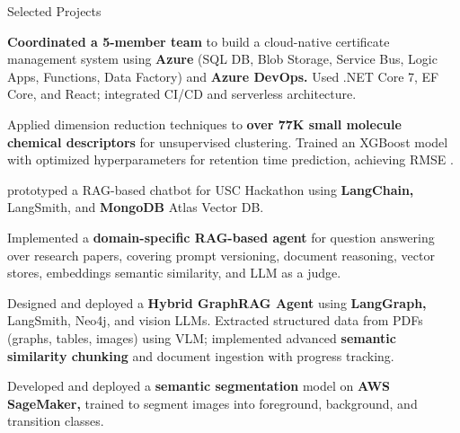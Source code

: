 \begin{cventries}
\cventry
    {}
    {Selected Projects}
    {}
    {}
    {
        \begin{cvitemsfree}
            \item{\textbf{Coordinated a 5-member team} to build a cloud-native certificate management system using \textbf{Azure} (SQL DB, Blob Storage, Service Bus, Logic Apps, Functions, Data Factory) and \textbf{Azure DevOps.} Used .NET Core 7, EF Core, and React; integrated CI/CD and serverless architecture.}
            \item{Applied dimension reduction techniques to \textbf{over 77K small molecule chemical descriptors} for unsupervised clustering. Trained an XGBoost model with optimized hyperparameters for retention time prediction, achieving RMSE \approx {}.}
            \item{prototyped a RAG-based chatbot for USC Hackathon using \textbf{LangChain,} LangSmith, and \textbf{MongoDB} Atlas Vector DB.}
            \item{Implemented a \textbf{domain-specific RAG-based agent} for question answering over research papers, covering prompt versioning, document reasoning, vector stores, embeddings semantic similarity, and LLM as a judge.}
            \item{Designed and deployed a \textbf{Hybrid GraphRAG Agent} using \textbf{LangGraph,} LangSmith, Neo4j, and vision LLMs. Extracted structured data from PDFs (graphs, tables, images) using VLM; implemented advanced \textbf{semantic similarity chunking} and document ingestion with progress tracking.}
            \item{Developed and deployed a \textbf{semantic segmentation} model on \textbf{AWS SageMaker,} trained to segment images into foreground, background, and transition classes.}

\end{cvitemsfree}}
\end{cventries}
